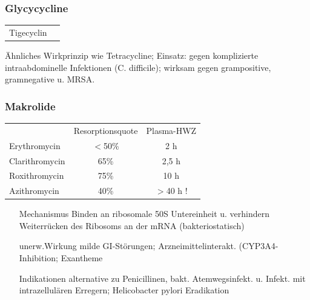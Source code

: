 \documentclass[10pt,a4paper]{report}
\begin{document}
\subsubsection{Glycycycline} %
\label{ssub:glycycycline}
\begin{tabularx}{\textwidth}{XX}
Tigecyclin\\
\end{tabularx}
Ähnliches Wirkprinzip wie Tetracycline; Einsatz: gegen komplizierte intraabdominelle Infektionen (C. difficile); wirksam gegen grampositive, gramnegative u. MRSA.
\subsubsection{Makrolide} %
\label{ssub:makrolide}
\begin{tabularx}{\textwidth}{lcc}
&Resorptionsquote&Plasma-HWZ\\
Erythromycin&$<$50\%&2 h\\
Clarithromycin&65\%&2,5 h\\
Roxithromycin&75\%&10 h\\
Azithromycin&40\%&$>$40 h !\\
\end{tabularx}
\begin{itemize}
	\item[Mechanismus] Binden an ribosomale 50S Untereinheit u. verhindern Weiterrücken des Ribosoms an der mRNA (bakteriostatisch)
	\item[unerw.Wirkung] milde GI-Störungen; Arzneimittelinterakt. (CYP3A4-Inhibition; Exantheme
	\item[Indikationen] alternative zu Penicillinen, bakt. Atemwegsinfekt. u. Infekt. mit intrazellulären Erregern; Helicobacter pylori Eradikation
\end{itemize}
\end{document}

